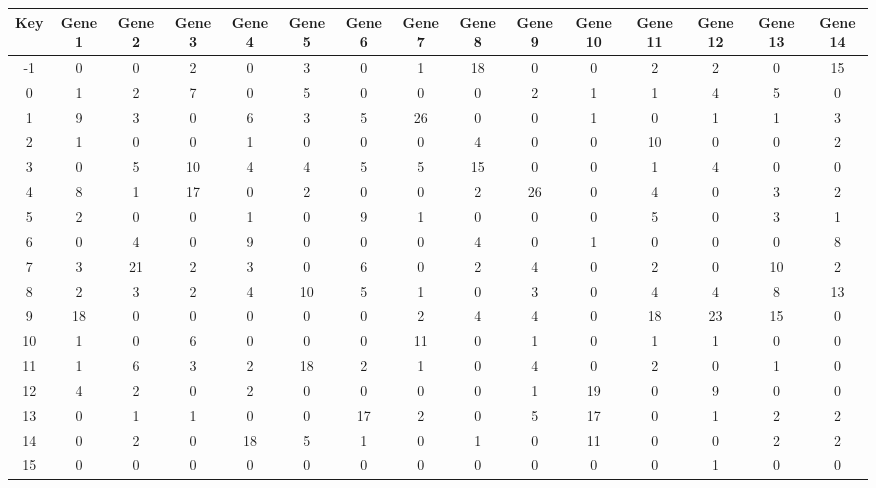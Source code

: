 \begin{tabular}{|c|c|c|c|c|c|c|c|c|c|c|c|c|c|c|}
\hline
Key & Gene 1 & Gene 2 & Gene 3 & Gene 4 & Gene 5 & Gene 6 & Gene 7 & Gene 8 & Gene 9 & Gene 10 & Gene 11 & Gene 12 & Gene 13 & Gene 14 \\
\hline
-1 & 0 & 0 & 2 & 0 & 3 & 0 & 1 & 18 & 0 & 0 & 2 & 2 & 0 & 15 \\
0 & 1 & 2 & 7 & 0 & 5 & 0 & 0 & 0 & 2 & 1 & 1 & 4 & 5 & 0 \\
1 & 9 & 3 & 0 & 6 & 3 & 5 & 26 & 0 & 0 & 1 & 0 & 1 & 1 & 3 \\
2 & 1 & 0 & 0 & 1 & 0 & 0 & 0 & 4 & 0 & 0 & 10 & 0 & 0 & 2 \\
3 & 0 & 5 & 10 & 4 & 4 & 5 & 5 & 15 & 0 & 0 & 1 & 4 & 0 & 0 \\
4 & 8 & 1 & 17 & 0 & 2 & 0 & 0 & 2 & 26 & 0 & 4 & 0 & 3 & 2 \\
5 & 2 & 0 & 0 & 1 & 0 & 9 & 1 & 0 & 0 & 0 & 5 & 0 & 3 & 1 \\
6 & 0 & 4 & 0 & 9 & 0 & 0 & 0 & 4 & 0 & 1 & 0 & 0 & 0 & 8 \\
7 & 3 & 21 & 2 & 3 & 0 & 6 & 0 & 2 & 4 & 0 & 2 & 0 & 10 & 2 \\
8 & 2 & 3 & 2 & 4 & 10 & 5 & 1 & 0 & 3 & 0 & 4 & 4 & 8 & 13 \\
9 & 18 & 0 & 0 & 0 & 0 & 0 & 2 & 4 & 4 & 0 & 18 & 23 & 15 & 0 \\
10 & 1 & 0 & 6 & 0 & 0 & 0 & 11 & 0 & 1 & 0 & 1 & 1 & 0 & 0 \\
11 & 1 & 6 & 3 & 2 & 18 & 2 & 1 & 0 & 4 & 0 & 2 & 0 & 1 & 0 \\
12 & 4 & 2 & 0 & 2 & 0 & 0 & 0 & 0 & 1 & 19 & 0 & 9 & 0 & 0 \\
13 & 0 & 1 & 1 & 0 & 0 & 17 & 2 & 0 & 5 & 17 & 0 & 1 & 2 & 2 \\
14 & 0 & 2 & 0 & 18 & 5 & 1 & 0 & 1 & 0 & 11 & 0 & 0 & 2 & 2 \\
15 & 0 & 0 & 0 & 0 & 0 & 0 & 0 & 0 & 0 & 0 & 0 & 1 & 0 & 0 \\
\hline
\end{tabular}